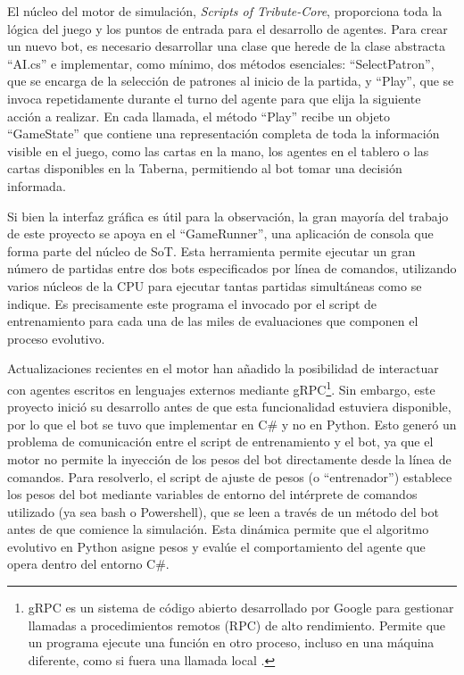 El núcleo del motor de simulación, \textit{Scripts of Tribute-Core}, proporciona toda la lógica del juego y los puntos de entrada para el desarrollo de agentes. Para crear un nuevo bot, es necesario desarrollar una clase que herede de la clase abstracta ``AI.cs'' e implementar, como mínimo, dos métodos esenciales: ``SelectPatron'', que se encarga de la selección de patrones al inicio de la partida, y ``Play'', que se invoca repetidamente durante el turno del agente para que elija la siguiente acción a realizar. En cada llamada, el método ``Play'' recibe un objeto ``GameState'' que contiene una representación completa de toda la información visible en el juego, como las cartas en la mano, los agentes en el tablero o las cartas disponibles en la Taberna, permitiendo al bot tomar una decisión informada.

Si bien la interfaz gráfica es útil para la observación, la gran mayoría del trabajo de este proyecto se apoya en el ``GameRunner'', una aplicación de consola que forma parte del núcleo de SoT. Esta herramienta permite ejecutar un gran número de partidas entre dos bots especificados por línea de comandos, utilizando varios núcleos de la CPU para ejecutar tantas partidas simultáneas como se indique. Es precisamente este programa el invocado por el script de entrenamiento para cada una de las miles de evaluaciones que componen el proceso evolutivo.

Actualizaciones recientes en el motor han añadido la posibilidad de interactuar con agentes escritos en lenguajes externos mediante gRPC\footnote{gRPC es un sistema de código abierto desarrollado por Google para gestionar llamadas a procedimientos remotos (RPC) de alto rendimiento. Permite que un programa ejecute una función en otro proceso, incluso en una máquina diferente, como si fuera una llamada local \cite{google_grpc_2016}.}. Sin embargo, este proyecto inició su desarrollo antes de que esta funcionalidad estuviera disponible, por lo que el bot se tuvo que implementar en C\# y no en Python. Esto generó un problema de comunicación entre el script de entrenamiento y el bot, ya que el motor no permite la inyección de los pesos del bot directamente desde la línea de comandos. Para resolverlo, el script de ajuste de pesos (o ``entrenador'') establece los pesos del bot mediante variables de entorno del intérprete de comandos utilizado (ya sea bash o Powershell), que se leen a través de un método del bot antes de que comience la simulación. Esta dinámica permite que el algoritmo evolutivo en Python asigne pesos y evalúe el comportamiento del agente que opera dentro del entorno C\#.

